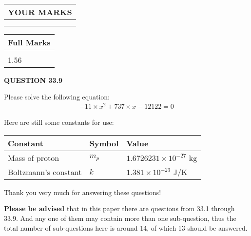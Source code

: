 \documentclass[12pt]{article}
\begin{document}
 

 
\vspace{0.3in}
  
\vspace{0.2in}
  
\noindent\begin{tabular}{|l|}
\hline
 YOUR MARKS  \\
\hline
 \\ 
 \\ 
\hline
\end{tabular}
\hspace{0.05in} \begin{tabular}{|l|}
\hline
 Full Marks  \\
\hline
 \\ 
1.56 \\
\hline
\end{tabular}
{\textbf{\Large{QUESTION
33.9 
}}}
  
  
 
 

 
Please solve the following equation:
\begin{eqnarray*}
-11 \times x^2  %
+  %
737
                 \times x    %
-12122 =0
\end{eqnarray*}
 

 

 
\vspace{0.3in}
   
   
 \vspace{0.2in}
Here are still some constants for use:
 
 
\noindent\begin{tabular}{|l|l|l|}
\hline
Constant & Symbol & Value \\
\hline
 
Mass of proton &
$m_p$ &
 $ 1.6726231 \times 10^{-27} $
kg \\
\hline
 
Boltzmann's constant &
$k$ &
 $ 1.381 \times 10^{-23} $
J/K \\
\hline
 
\end{tabular}
 
Thank you very much for answering these questions!
 
{\textbf{\large{Please be advised}}} that in this paper there are questions from
33.1 through
33.9.
And any one of them may contain more than one sub-question, thus the total number
of sub-questions here is around 14, of which
13 should be answered.
 
\end{document}
